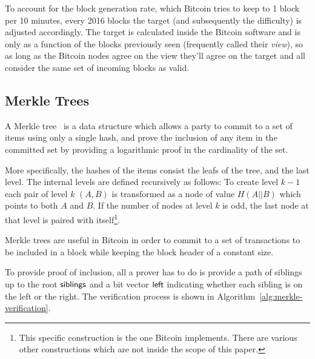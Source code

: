 To account for the block generation rate, which Bitcoin tries to keep to 1 block per 10 minutes, every 2016 blocks the target (and subsequently the difficulty) is adjusted accordingly. The target is calculated inside the Bitcoin software and is only as a function of the blocks previously seen (frequently called their \emph{view}), so as long as the Bitcoin nodes agree on the view they'll agree on the target and all consider the same set of incoming blocks as valid.


\subsection{\label{sec:merkle-trees}Merkle Trees}
A Merkle tree~\cite{merkle} is a data structure which allows a party to commit to a set of items using  only a single hash, and prove the inclusion of any item in the committed set by providing a logarithmic proof in the cardinality of the set.

More specifically, the hashes of the items consist the leafs of the tree, and the last level. The internal levels are defined recursively as follows: To create level $k-1$ each pair of level $k$ $(A, B)$ is transformed as a node of value $H(A || B)$ which points to both $A$ and $B$. If the number of nodes at level $k$ is odd, the last node at that level is paired with itself\footnote{This specific construction is the one Bitcoin implements. There are various other constructions which are not inside the scope of this paper.}.


Merkle trees are useful in Bitcoin in order to commit to a set of transactions to be included in a block while keeping the block header of a constant size.

To provide proof of inclusion, all a prover has to do is provide a path of siblings up to the root $\sf{siblings}$ and a bit vector $\sf{left}$ indicating whether each sibling is on the left or the right. The verification process is shown in Algorithm~\ref{alg:merkle-verification}.

